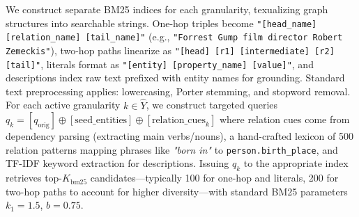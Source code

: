 \documentclass[conference]{IEEEtran}
\begin{document}
We construct separate BM25 indices for each granularity, texualizing graph structures into searchable strings. One-hop triples become \texttt{"[head\_name] [relation\_name] [tail\_name]"} (e.g., \texttt{"Forrest Gump film director Robert Zemeckis"}), two-hop paths linearize as \texttt{"[head] [r1] [intermediate] [r2] [tail]"}, literals format as \texttt{"[entity] [property\_name] [value]"}, and descriptions index raw text prefixed with entity names for grounding. Standard text preprocessing applies: lowercasing, Porter stemming, and stopword removal. For each active granularity $k \in \hat{Y}$, we construct targeted queries $q_k = [q_{\text{orig}}] \oplus [\text{seed\_entities}] \oplus [\text{relation\_cues}_k]$ where relation cues come from dependency parsing (extracting main verbs/nouns), a hand-crafted lexicon of 500 relation patterns mapping phrases like \emph{"born in"} to \texttt{person.birth\_place}, and TF-IDF keyword extraction for descriptions. Issuing $q_k$ to the appropriate index retrieves top-$K_{\text{bm25}}$ candidates—typically 100 for one-hop and literals, 200 for two-hop paths to account for higher diversity—with standard BM25 parameters $k_1=1.5$, $b=0.75$.
\end{document}
